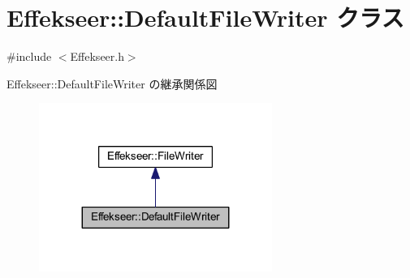 \hypertarget{class_effekseer_1_1_default_file_writer}{}\section{Effekseer\+:\+:Default\+File\+Writer クラス}
\label{class_effekseer_1_1_default_file_writer}


{\ttfamily \#include $<$Effekseer.\+h$>$}



Effekseer\+:\+:Default\+File\+Writer の継承関係図\nopagebreak
\begin{figure}[H]
\begin{center}
\leavevmode
\includegraphics[width=215pt]{class_effekseer_1_1_default_file_writer__inherit__graph}
\end{center}
\end{figure}
